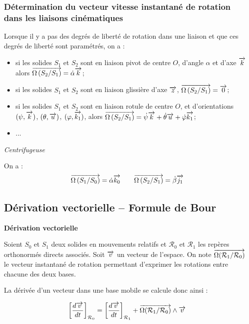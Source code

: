\documentclass[10pt,oneside]{article}
\begin{document}
\subsubsection{Détermination du vecteur vitesse instantané de rotation dans les liaisons cinématiques}

\begin{resultat}
Lorsque il y a pas des degrés de liberté de rotation dans une liaison et que ces degrés de liberté sont paramétrés, on a :  
\begin{itemize}
\item si les solides $S_1$ et $S_2$ sont en liaison pivot de centre $O$, d'angle $\alpha$ et d'axe $\overrightarrow{k}$ alors $\overrightarrow{\Omega\left( {S_2}/{S_1}\right)}=\dot{\alpha}\overrightarrow{k}$;
\item si les solides $S_1$ et $S_2$ sont en liaison glissière d'axe $\overrightarrow{z}$, $\overrightarrow{\Omega\left( {S_2}/{S_1}\right)}=\overrightarrow{0}$; 
\item si les solides $S_1$ et $S_2$ sont en liaison rotule de centre $O$,  et d'orientations $(\psi,\overrightarrow{k})$, $(\theta,\overrightarrow{u})$, $(\varphi,\overrightarrow{k_1})$, alors $\overrightarrow{\Omega\left( {S_2}/{S_1}\right)}=\dot{\psi}\overrightarrow{k}+\dot{\theta}\overrightarrow{u}+\dot{\varphi}\overrightarrow{k_1}$;
\item ...
\end{itemize}
\end{resultat}

\begin{exemple}
\textit{Centrifugeuse}

On a :
$$
\overrightarrow{\Omega\left( {S_1}/{S_0}\right)} = \dot{\alpha}\overrightarrow{k_0} 
\quad \quad
\overrightarrow{\Omega\left( {S_2}/{S_1}\right)} = \dot{\beta}\overrightarrow{j_1} 
$$

\end{exemple}
\subsection{Dérivation vectorielle -- Formule de Bour}


\begin{resultat}
\textbf{Dérivation vectorielle}

Soient $S_0$ et $S_1$ deux solides en mouvements relatifs et $\mathcal{R}_0$ et $\mathcal{R}_1$ les repères orthonormés directs associés. Soit $\overrightarrow{v}$ un vecteur de l'espace. On note $\overrightarrow{\Omega(\mathcal{R}_1/\mathcal{R}_0)}$ le vecteur instantané de rotation permettant d'exprimer les rotations entre chacune des deux bases. 

La dérivée d'un vecteur dans une base mobile se calcule donc ainsi :

$$
\left[\dfrac{d\overrightarrow{v}}{dt}\right]_{\mathcal{R}_0} =
\left[\dfrac{d\overrightarrow{v}}{dt}\right]_{\mathcal{R}_1} 
+ \overrightarrow{\Omega(\mathcal{R}_1/\mathcal{R}_0)}\wedge \overrightarrow{v}
$$
\end{resultat}
\end{document}
